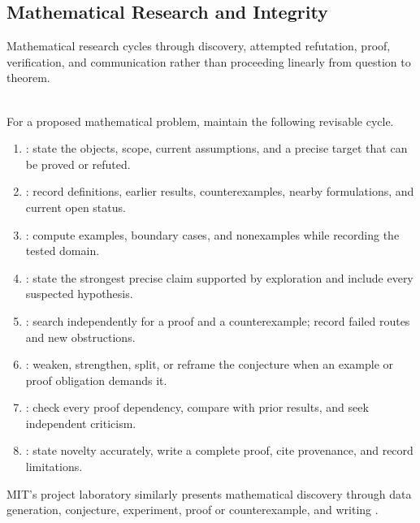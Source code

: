 \subsection{Mathematical Research and Integrity}

Mathematical research cycles through discovery, attempted refutation, proof, verification, and communication rather than proceeding linearly from question to theorem.

\begin{process} \label{proc:mathematical-research-cycle} \\
For a proposed mathematical problem, maintain the following revisable cycle.
\begin{enumerate}[label=(\roman*)]
\setlength{\itemsep}{0pt}
\item {}: state the objects, scope, current assumptions, and a precise target that can be proved or refuted.
\item {}: record definitions, earlier results, counterexamples, nearby formulations, and current open status.
\item {}: compute examples, boundary cases, and nonexamples while recording the tested domain.
\item {}: state the strongest precise claim supported by exploration and include every suspected hypothesis.
\item {}: search independently for a proof and a counterexample; record failed routes and new obstructions.
\item {}: weaken, strengthen, split, or reframe the conjecture when an example or proof obligation demands it.
\item {}: check every proof dependency, compare with prior results, and seek independent criticism.
\item {}: state novelty accurately, write a complete proof, cite provenance, and record limitations.
\end{enumerate}
MIT's project laboratory similarly presents mathematical discovery through data generation, conjecture, experiment, proof or counterexample, and writing \citep{mit2013projectlaboratory}.
\end{process}

